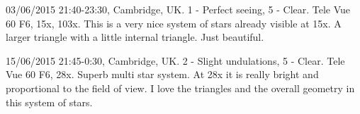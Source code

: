 \item 03/06/2015 21:40-23:30, Cambridge, UK. 1 - Perfect seeing, 5 - Clear. Tele Vue 60 F6, 15x, 103x. This is a very nice system of stars already visible at 15x. A larger triangle with a little internal triangle. Just beautiful.
\item 15/06/2015 21:45-0:30, Cambridge, UK. 2 - Slight undulations, 5 - Clear. Tele Vue 60 F6, 28x. Superb multi star system. At 28x it is really bright and proportional to the field of view. I love the triangles and the overall geometry in this system of stars.
